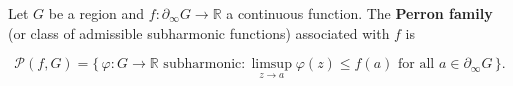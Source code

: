 Let $G$ be a region and $f: \partial_\infty G \to \mathbb{R}$ a continuous function. The \textbf{Perron family} (or class of admissible subharmonic functions) associated with $f$ is

$$\mathcal{P}(f, G) = \{\, \varphi: G \to \mathbb{R} \text{ subharmonic} : \limsup_{z \to a} \varphi(z) \leq f(a) \text{ for all } a \in \partial_\infty G \,\}.$$
